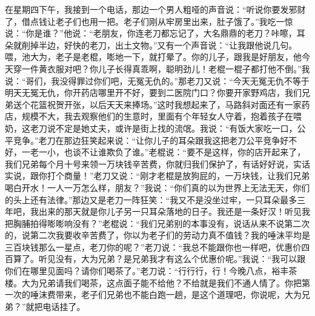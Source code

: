 \documentclass[12pt,oneside]{book}
\begin{document}
在星期四下午，我接到一个电话，那边一个男人粗哑的声音说：``听说你要发邪财了，借点钱让老子们也用一把。老子们刚从牢房里出来，肚子饿了。''我吃一惊说：``你是谁？''他说：``老朋友，你连老刀都忘记了，大名鼎鼎的老刀？咔嚓，耳朵就削掉半边，好快的老刀，出土文物。''又有一个声音说：``让我跟他说几句。喂，池大为，老子是老棍，嘭地一下，就打晕了。你的儿子，跟我是好朋友，他今天穿一件黄衣服对吧？你儿子长得真乖啊，聪明劲儿！老棍一棍子都打他不倒。''我说：``哥们，我没得罪过你们吧，无冤无仇的。''那老刀又说：``今天无冤无仇不等于明天无冤无仇，你开药店哪里开不好，要到二医院门口？你要开家野鸡店，我们兄弟送个花篮祝贺开张，以后天天来捧场。''这时我想起来了，马路斜对面还有一家药店，规模不大，我去观察他们的生意时，里面有个年轻女人守着，抱着孩子在喂奶，这老刀说不定是她丈夫，或许是街上找的流氓。我说：``有饭大家吃一口，公平竞争。''老刀在那边狂笑起来说：``让你儿子的耳朵跟我这把老刀公平竞争好不好，一老一小，也谈不让谁欺负了谁。''老棍说：``要不是这样，你的店开起来了，我们兄弟每个月十号来领一万块钱辛苦费，你就归我们保护了，有话好好说，实话实说，跟你打个商量！''老刀又说：``刚才老棍是放狗屁的，一万块钱，让我们兄弟喝白开水！一人一万怎么样，朋友？''我说：``你们真的以为世界上无法无天，你们的头上还有法律。''那边又是老刀一阵狂笑：``我又不是没坐过牢，一只耳朵最多三年吧，我出来的那天就是你儿子另一只耳朵落地的日子。我还是一条好汉！听见我把胸脯拍得嘭嘭响没有？''老棍说：``我们兄弟别的本事没有，说话从来不说第二次的，说第二次我要收辛苦费了，你以为老子们的劳动力真不值钱？我的唾沫平均是三百块钱那么一星点，老刀你的呢？''老刀说：``我总不能跟你也一样吧，优惠价四百算了。听见没有，大为兄弟？是兄弟我才有这么个优惠价呢。''我说：``我可以跟你们在哪里见面吗？请你们喝茶了。''老刀说：``行行行，行！今晚八点，裕丰茶楼。大为兄弟请我们喝茶，这点面子能不给他？不给就是我们不通人情了。你把第一次的唾沫费带来，老子们兄弟也不能白跑一趟，是这个道理吧，你说呢，大为兄弟？''就把电话挂了。
\end{document}
